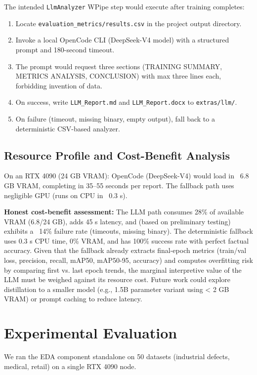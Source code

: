 \documentclass[10pt,twocolumn,letterpaper]{article}
\begin{document}
The intended \texttt{LlmAnalyzer} WPipe step would execute after training completes:
\begin{enumerate}
    \item Locate \texttt{evaluation\_metrics/results.csv} in the project output directory.
    \item Invoke a local OpenCode CLI (DeepSeek-V4 model) with a structured prompt and 180-second timeout.
    \item The prompt would request three sections (TRAINING SUMMARY, METRICS ANALYSIS, CONCLUSION) with max three lines each, forbidding invention of data.
    \item On success, write \texttt{LLM\_Report.md} and \texttt{LLM\_Report.docx} to \texttt{extras/llm/}.
    \item On failure (timeout, missing binary, empty output), fall back to a deterministic CSV-based analyzer.
\end{enumerate}

\subsection{Resource Profile and Cost-Benefit Analysis}
On an RTX 4090 (24 GB VRAM): OpenCode (DeepSeek-V4) would load in ~6.8 GB VRAM, completing in 35--55 seconds per report. The fallback path uses negligible GPU (runs on CPU in ~0.3 s).

\textbf{Honest cost-benefit assessment:} The LLM path consumes 28\% of available VRAM (6.8/24 GB), adds 45 s latency, and (based on preliminary testing) exhibits a ~14\% failure rate (timeouts, missing binary). The deterministic fallback uses 0.3 s CPU time, 0\% VRAM, and has 100\% success rate with perfect factual accuracy. Given that the fallback already extracts final-epoch metrics (train/val loss, precision, recall, mAP50, mAP50-95, accuracy) and computes overfitting risk by comparing first vs. last epoch trends, the marginal interpretive value of the LLM must be weighed against its resource cost. Future work could explore distillation to a smaller model (e.g., 1.5B parameter variant using < 2 GB VRAM) or prompt caching to reduce latency.

\section{Experimental Evaluation}
We ran the EDA component standalone on 50 datasets (industrial defects, medical, retail) on a single RTX 4090 node.
\end{document}
